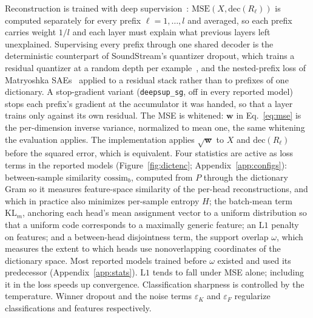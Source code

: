 Reconstruction is trained with deep supervision~\cite{lee2015deeply}:
$\mathrm{MSE}(X, \mathrm{dec}(R_\ell))$ is computed separately for
every prefix $\ell = 1, \dots, l$ and averaged, so each prefix carries
weight $1/l$ and each
layer must explain what previous layers left
unexplained. Supervising every prefix through one shared decoder is the
deterministic counterpart of SoundStream's quantizer dropout, which trains
a residual quantizer at a random depth per example~\cite{zeghidour2021},
and the nested-prefix loss of Matryoshka SAEs~\cite{bussmann2025} applied
to a residual stack rather than to prefixes of one dictionary.
A stop-gradient variant (\texttt{deepsup\_sg}, off in every
reported model) stops each prefix's gradient at the accumulator it was
handed, so that a layer trains only against its own residual. The MSE is whitened: $\mathbf{w}$ in
Eq.~\eqref{eq:mse} is the per-dimension inverse variance, normalized
to mean one, the same whitening the evaluation applies. The
implementation applies $\sqrt{\mathbf{w}}$ to $X$ and
$\mathrm{dec}(R_\ell)$ before the squared error, which is equivalent.
Four statistics are active as loss terms in the reported models
(Figure~\ref{fig:dictenc}; Appendix~\ref{app:configs}):
between-sample similarity $\mathrm{cossim}_b$, computed from $P$
through the dictionary Gram so it measures feature-space similarity of
the per-head reconstructions, and which in practice also minimizes
per-sample entropy $H$; the batch-mean term $\mathrm{KL}_m$, anchoring
each head's mean
assignment vector to a uniform distribution so that a uniform code
corresponds to a maximally generic feature; an $\mathrm{L1}$ penalty on
features; and a between-head disjointness term, the support overlap
$\omega$, which measures the extent to which heads use nonoverlapping
coordinates of the dictionary space. Most reported models trained before
$\omega$ existed and used its predecessor (Appendix~\ref{app:stats}).
$\mathrm{L1}$ tends to fall under MSE alone; including it in the loss
speeds up convergence. Classification sharpness is controlled by the
temperature. Winner dropout and the noise terms
$\varepsilon_K$ and $\varepsilon_F$ regularize classifications and
features respectively.

